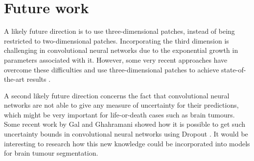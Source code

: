 \documentclass[12pt,a4paper,twoside,openright]{report}
\begin{document}
\section{Future work}
A likely future direction is to use three-dimensional patches, instead of being restricted to two-dimensional patches. Incorporating the third dimension is challenging in convolutional neural networks due to the exponential growth in parameters associated with it. However, some very recent approaches have overcome these difficulties and use \mbox{three-dimensional} patches to achieve state-of-the-art results \cite{kamnitas}. 

A second likely future direction concerns the fact that convolutional neural networks are not able to give any measure of uncertainty for their predictions, which might be very important for life-or-death cases such as brain tumours. Some recent work by Gal and Ghahramani showed how it is possible to get such uncertainty bounds in convolutional neural networks using Dropout \cite{Gal2015Dropout}. It would be interesting to research how this new knowledge could be incorporated into models for brain tumour segmentation.




\appendix

%
%
\end{document}
